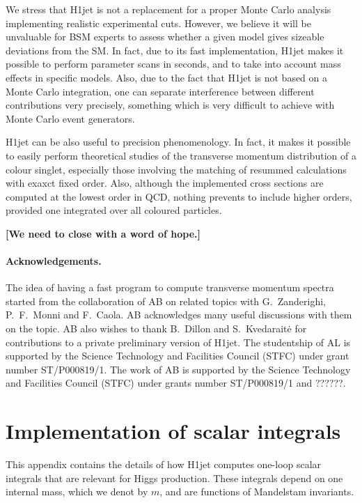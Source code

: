 \documentclass[12pt,a4wide]{article}
\begin{document}
We stress that H1jet is not a replacement for a proper Monte Carlo
analysis implementing realistic experimental cuts. However, we believe
it will be unvaluable for BSM experts to assess whether a given model
gives sizeable deviations from the SM. In fact, due to its fast
implementation, H1jet makes it possible to perform parameter scans in
seconds, and to take into account mass effects in specific
models. Also, due to the fact that H1jet is not based on a Monte Carlo
integration, one can separate interference between different
contributions very precisely, something which is very difficult to
achieve with Monte Carlo event generators.

H1jet can be also useful to precision phenomenology. In fact, it makes
it possible to easily perform theoretical studies of the transverse
momentum distribution of a colour singlet, especially those involving
the matching of resummed calculations with exaxct fixed order. Also,
although the implemented cross sections are computed at the lowest
order in QCD, nothing prevents to include higher orders, provided one
integrated over all coloured particles.

{\bf [We need to close with a word of hope.]}

\paragraph{Acknowledgements.} The idea of having a fast program to
compute transverse momentum spectra started from the collaboration of
AB on related topics with G.~Zanderighi, P.~F.~Monni and F.~Caola. AB
acknowledges many useful discussions with them on the topic. AB also
wishes to thank B.~Dillon and S.~Kvedarait\.e for contributions to a
private preliminary version of H1jet. The studentship of AL is
supported by the Science Technology and Facilities Council (STFC)
under grant number ST/P000819/1. The work of AB is supported by the
Science Technology and Facilities Council (STFC) under grants number
ST/P000819/1 and ??????.

\appendix

\section{Implementation of scalar integrals}
\label{sec:scalar-integrals}

This appendix contains the details of how H1jet computes one-loop
scalar integrals that are relevant for Higgs production. These
integrals depend on one internal mass, which we denot by $m$, and are
functions of Mandelstam
invariants.
\end{document}
